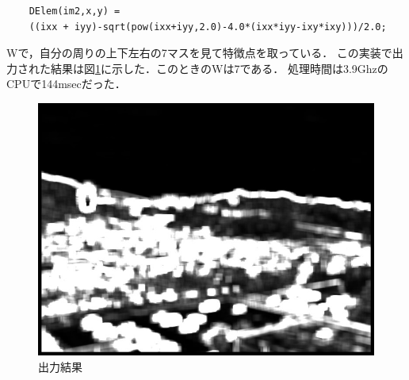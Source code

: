 \documentclass[11pt]{jarticle}
\begin{document}
\begin{verbatim}
    DElem(im2,x,y) = 
    ((ixx + iyy)-sqrt(pow(ixx+iyy,2.0)-4.0*(ixx*iyy-ixy*ixy)))/2.0;
\end{verbatim}
Wで，自分の周りの上下左右の7マスを見て特徴点を取っている．
この実装で出力された結果は図\ref{4-1.jpg}に示した．このときのWは7である．
処理時間は3.9GhzのCPUで144msecだった．

\begin{figure}[t]
    \centering
    \includegraphics[scale=.5]{4-1.jpg}
    \caption{出力結果}
    \label{4-1.jpg}
\end{figure}
\end{document}
